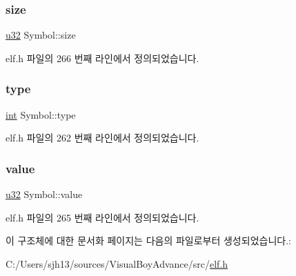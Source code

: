 \subsubsection{\texorpdfstring{size}{size}}
{\footnotesize\ttfamily \mbox{\hyperlink{_system_8h_a10e94b422ef0c20dcdec20d31a1f5049}{u32}} Symbol\+::size}



elf.\+h 파일의 266 번째 라인에서 정의되었습니다.

\mbox{\label{struct_symbol_a3a8a7698da2e96f2fd77296b5191ce6f}} 
\subsubsection{\texorpdfstring{type}{type}}
{\footnotesize\ttfamily \mbox{\hyperlink{_util_8cpp_a0ef32aa8672df19503a49fab2d0c8071}{int}} Symbol\+::type}



elf.\+h 파일의 262 번째 라인에서 정의되었습니다.

\mbox{\label{struct_symbol_aefbe563b4964a3cc4ee85c3efaccb7d2}} 
\subsubsection{\texorpdfstring{value}{value}}
{\footnotesize\ttfamily \mbox{\hyperlink{_system_8h_a10e94b422ef0c20dcdec20d31a1f5049}{u32}} Symbol\+::value}



elf.\+h 파일의 265 번째 라인에서 정의되었습니다.



이 구조체에 대한 문서화 페이지는 다음의 파일로부터 생성되었습니다.\+:\begin{DoxyCompactItemize}
\item 
C\+:/\+Users/sjh13/sources/\+Visual\+Boy\+Advance/src/\mbox{\hyperlink{elf_8h}{elf.\+h}}\end{DoxyCompactItemize}
